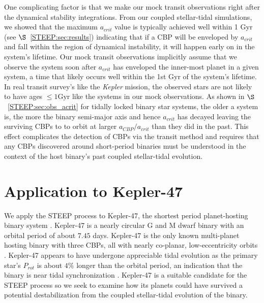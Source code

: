 One complicating factor is that we make our mock transit observations right after the dynamical stability integrations.  From our coupled stellar-tidal \vplanet simulations, we showed that the maximum $a_{crit}$ value is typically achieved well within 1 Gyr (see $\S$~\ref{STEEP:sec:results}) indicating that if a CBP will be enveloped by $a_{crit}$ and fall within the region of dynamical instability, it will happen early on in the system's lifetime.  Our mock transit observations implicitly assume that we observe the system soon after $a_{crit}$ has enveloped the inner-most planet in a given system, a time that likely occurs well within the 1st Gyr of the system's lifetime.  In real transit survey's like the \textit{Kepler} mission, the observed stars are not likely to have ages $\leq 1 \text{Gyr}$ like the systems in our mock observations.  As shown in $\S$~\ref{STEEP:sec:obs_acrit} for tidally locked binary star systems, the older a system is, the more the binary semi-major axis and hence $a_{crit}$ has decayed leaving the surviving CBPs to to orbit at larger $a_{CBP}/a_{crit}$ than they did in the past.  This effect complicates the detection of CBPs via the transit method and requires that any CBPs discovered around short-period binaries must be understood in the context of the host binary's past coupled stellar-tidal evolution.


\section{Application to Kepler-47} \label{STEEP:sec:kepler47}

We apply the STEEP process to Kepler-47, the shortest period planet-hosting binary system \citep{Orosz2012}.  Kepler-47 is a nearly circular G and M dwarf binary with an orbital period of about $7.45$ days.  Kepler-47 is the only known multi-planet hosting binary with three CBPs, all with nearly co-planar, low-eccentricity orbits \citep{Orosz2012,Welsh2015}.  Kepler-47 appears to have undergone appreciable tidal evolution as the primary star's $P_{rot}$ is about $4\%$ longer than the orbital period, an indication that the binary is near tidal synchronization \citep{Orosz2012}.  Kepler-47 is a suitable candidate for the STEEP process so we seek to examine how its planets could have survived a potential destabilization from the coupled stellar-tidal evolution of the binary.  

